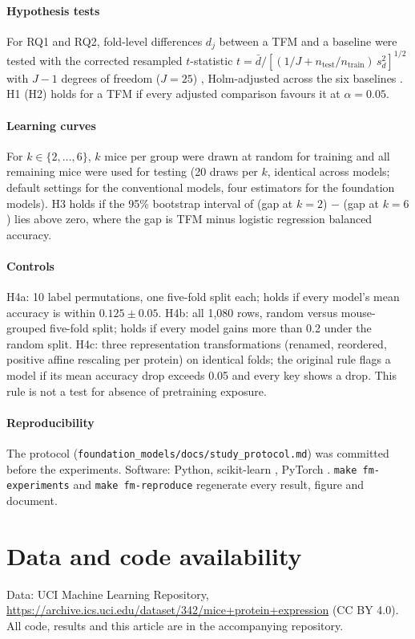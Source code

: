 \documentclass[10pt]{article}
\begin{document}
\paragraph{Hypothesis tests} For RQ1 and RQ2, fold-level differences $d_j$ between a TFM and a
baseline were tested with the corrected resampled $t$-statistic
$t = \bar d / [(1/J + n_{\mathrm{test}}/n_{\mathrm{train}})\, s_d^2]^{1/2}$ with $J - 1$ degrees
of freedom ($J = 25$) \cite{nadeau2003, bouckaert2004}, Holm-adjusted across the six baselines
\cite{holm1979}. H1 (H2) holds for a TFM if every adjusted comparison favours it at
$\alpha = 0.05$.

\paragraph{Learning curves} For $k \in \{2, \dots, 6\}$, $k$ mice per group were drawn at random
for training and all remaining mice were used for testing (20 draws per $k$, identical across
models; default settings for the conventional models, four estimators for the foundation
models). H3 holds if the 95\% bootstrap interval of
(gap at $k = 2$) $-$ (gap at $k = 6$) lies above zero, where the gap is TFM minus logistic
regression balanced accuracy.

\paragraph{Controls} H4a: 10 label permutations, one five-fold split each; holds if every model's
mean accuracy is within $0.125 \pm 0.05$. H4b: all 1{,}080 rows, random versus mouse-grouped
five-fold split; holds if every model gains more than 0.2 under the random split. H4c: three
representation transformations (renamed, reordered, positive affine rescaling per protein)
on identical folds; the original rule flags a model if its mean accuracy drop exceeds 0.05
and every key shows a drop. This rule is not a test for absence of pretraining exposure.

\paragraph{Reproducibility} The protocol (\texttt{foundation\_models/docs/study\_protocol.md})
was committed before the experiments. Software: Python, scikit-learn \SklearnVersion, PyTorch
\TorchVersion. \texttt{make fm-experiments} and \texttt{make fm-reproduce} regenerate every
result, figure and document.

\section*{Data and code availability}
Data: UCI Machine Learning Repository,
\url{https://archive.ics.uci.edu/dataset/342/mice+protein+expression} (CC BY 4.0). All code,
results and this article are in the accompanying repository.
\end{document}
